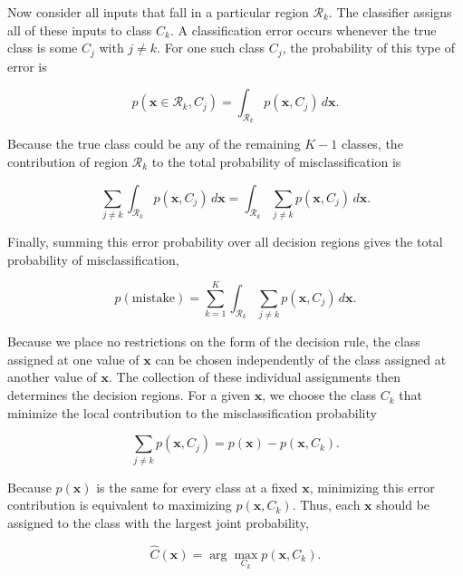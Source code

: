 \documentclass[10pt,twocolumn]{memoir}
\begin{document}
Now consider all inputs that fall in a particular region $\mathcal{R}_k$. The classifier assigns all of these inputs to class $C_k$. A classification error occurs whenever the true class is some $C_j$ with $j\neq k$. For one such class $C_j$, the probability of this type of error is

\begin{equation}
    p(\mathbf{x}\in\mathcal{R}_k,C_j) = \int_{\mathcal{R}_k}p(\mathbf{x},C_j)\,d\mathbf{x}.
\end{equation}

Because the true class could be any of the remaining $K-1$ classes, the contribution of region $\mathcal{R}_k$ to the total probability of misclassification is

\begin{equation}
    \sum_{j\neq k}\int_{\mathcal{R}_k}p(\mathbf{x},C_j)\,d\mathbf{x} = \int_{\mathcal{R}_k}\sum_{j\neq k}p(\mathbf{x},C_j)\,d\mathbf{x}.
\end{equation}

Finally, summing this error probability over all decision regions gives the total probability of misclassification,

\begin{equation}
    p(\mathrm{mistake}) = \sum_{k=1}^{K}\int_{\mathcal{R}_k}\sum_{j\neq k}p(\mathbf{x},C_j)\,d\mathbf{x}.
\end{equation}

Because we place no restrictions on the form of the decision rule, the class assigned at one value of $\mathbf{x}$ can be chosen independently of the class assigned at another value of $\mathbf{x}$. The collection of these individual assignments then determines the decision regions. For a given $\mathbf{x}$, we choose the class $C_k$ that minimize the local contribution to the misclassification probability

\begin{equation}
    \sum_{j\neq k} p(\mathbf{x},C_j) = p(\mathbf{x})-p(\mathbf{x},C_k).
\end{equation}

Because $p(\mathbf{x})$ is the same for every class at a fixed $\mathbf{x}$, minimizing this error contribution is equivalent to maximizing $p(\mathbf{x},C_k)$. Thus, each $\mathbf{x}$ should be assigned to the class with the largest joint probability,

\begin{equation}
    \hat{C}(\mathbf{x}) = \arg\max_{C_k} p(\mathbf{x},C_k).
\end{equation}
\end{document}
